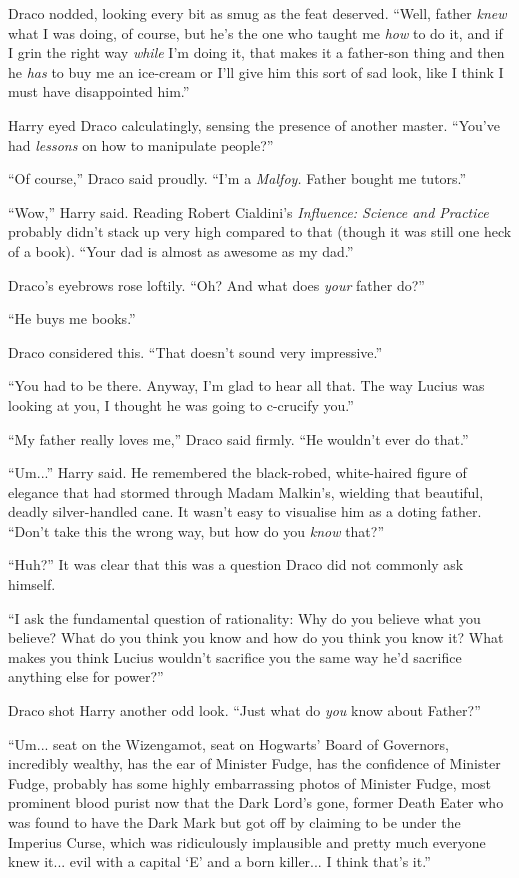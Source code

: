 Draco nodded, looking every bit as smug as the feat deserved. ``Well, father \emph{knew} what I was doing, of course, but he's the one who taught me \emph{how} to do it, and if I grin the right way \emph{while} I'm doing it, that makes it a father-son thing and then he \emph{has} to buy me an ice-cream or I'll give him this sort of sad look, like I think I must have disappointed him.''

Harry eyed Draco calculatingly, sensing the presence of another master. ``You've had \emph{lessons} on how to manipulate people?''

``Of course,'' Draco said proudly. ``I'm a \emph{Malfoy.} Father bought me tutors.''

``Wow,'' Harry said. Reading Robert Cialdini's \emph{Influence: Science and Practice} probably didn't stack up very high compared to that (though it was still one heck of a book). ``Your dad is almost as awesome as my dad.''

Draco's eyebrows rose loftily. ``Oh? And what does \emph{your} father do?''

``He buys me books.''

Draco considered this. ``That doesn't sound very impressive.''

``You had to be there. Anyway, I'm glad to hear all that. The way Lucius was looking at you, I thought he was going to c-crucify you.''

``My father really loves me,'' Draco said firmly. ``He wouldn't ever do that.''

``Um...'' Harry said. He remembered the black-robed, white-haired figure of elegance that had stormed through Madam Malkin's, wielding that beautiful, deadly silver-handled cane. It wasn't easy to visualise him as a doting father. ``Don't take this the wrong way, but how do you \emph{know} that?''

``Huh?'' It was clear that this was a question Draco did not commonly ask himself.

``I ask the fundamental question of rationality: Why do you believe what you believe? What do you think you know and how do you think you know it? What makes you think Lucius wouldn't sacrifice you the same way he'd sacrifice anything else for power?''

Draco shot Harry another odd look. ``Just what do \emph{you} know about Father?''

``Um... seat on the Wizengamot, seat on Hogwarts' Board of Governors, incredibly wealthy, has the ear of Minister Fudge, has the confidence of Minister Fudge, probably has some highly embarrassing photos of Minister Fudge, most prominent blood purist now that the Dark Lord's gone, former Death Eater who was found to have the Dark Mark but got off by claiming to be under the Imperius Curse, which was ridiculously implausible and pretty much everyone knew it... evil with a capital `E' and a born killer... I think that's it.''

